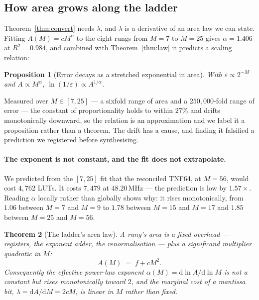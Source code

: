 \documentclass[11pt]{article}
\newtheorem{theorem}{Theorem}
\newtheorem{proposition}[theorem]{Proposition}
\theoremstyle{definition}
\begin{document}
\subsection{How area grows along the ladder}\label{sec:arealaw}

Theorem~\ref{thm:convert} needs $\lambda$, and $\lambda$ is a derivative of an
area law we can state. Fitting $A(M) = cM^{\alpha}$ to the eight rungs from
$M{=}7$ to $M{=}25$ gives $\alpha = 1.406$ at $R^2 = 0.984$, and combined with
Theorem~\ref{thm:law} it predicts a scaling relation:

\begin{proposition}[Error decays as a stretched exponential in area]
\label{prop:stretched}
With $\varepsilon \propto 2^{-M}$ and $A \propto M^{\alpha}$,
$\ln(1/\varepsilon) \propto A^{1/\alpha}$.
\end{proposition}

Measured over $M \in [7,25]$ --- a sixfold range of area and a $250{,}000$-fold
range of error --- the constant of proportionality holds to within $27\%$ and
drifts monotonically downward, so the relation is an approximation and we label
it a proposition rather than a theorem. The drift has a cause, and finding it
falsified a prediction we registered before synthesising.

\paragraph{The exponent is not constant, and the fit does not extrapolate.} We
predicted from the $[7,25]$ fit that the reconciled TNF64, at $M = 56$, would
cost $4{,}762$ LUTs. It costs $7{,}479$ at $48.20$\,MHz --- the prediction is low
by $1.57\times$. Reading $\alpha$ locally rather than globally shows why: it rises
monotonically, from $1.06$ between $M{=}7$ and $M{=}9$ to $1.78$ between $M{=}15$
and $M{=}17$ and $1.85$ between $M{=}25$ and $M{=}56$.

\begin{theorem}[The ladder's area law]
\label{thm:alpha}
A rung's area is a fixed overhead --- registers, the exponent adder, the
renormalisation --- plus a significand multiplier quadratic in $M$:
\[
A(M) \;=\; f + cM^{2}.
\]
Consequently the effective power-law exponent
$\alpha(M) = \mathrm{d}\ln A/\mathrm{d}\ln M$ is not a constant but rises
monotonically toward $2$, and the marginal cost of a mantissa bit,
$\lambda = \mathrm{d}A/\mathrm{d}M = 2cM$, is \emph{linear} in $M$ rather than
fixed.
\end{theorem}
\end{document}
